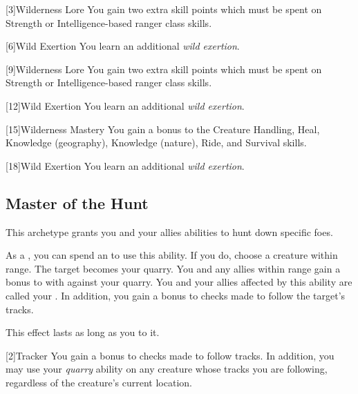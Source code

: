         [3]{Wilderness Lore} You gain two extra skill points which must be spent on Strength or Intelligence-based ranger class skills.

        [6]{Wild Exertion}
        You learn an additional \textit{wild exertion}.

        [9]{Wilderness Lore} You gain two extra skill points which must be spent on Strength or Intelligence-based ranger class skills.

        [12]{Wild Exertion} 
        You learn an additional \textit{wild exertion}.

        [15]{Wilderness Mastery} You gain a  bonus to the Creature Handling, Heal, Knowledge (geography), Knowledge (nature), Ride, and Survival skills.

        [18]{Wild Exertion} 
        You learn an additional \textit{wild exertion}.

    \subsection{Master of the Hunt}
        This archetype grants you and your allies abilities to hunt down specific foes.

        \label{Quarry}
        \begin{ability}
            As a , you can spend an  to use this ability.
            If you do, choose a creature within \rnglong range.
            The target becomes your quarry.
            You and any allies within range gain a  bonus to  with  against your quarry.
            You and your allies affected by this ability are called your .
            In addition, you gain a  bonus to checks made to follow the target's tracks.

            This effect lasts as long as you  to it.
        \end{ability}

        [2]{Tracker}
        You gain a  bonus to checks made to follow tracks.
        In addition, you may use your \textit{quarry} ability on any creature whose tracks you are following, regardless of the creature's current location.

